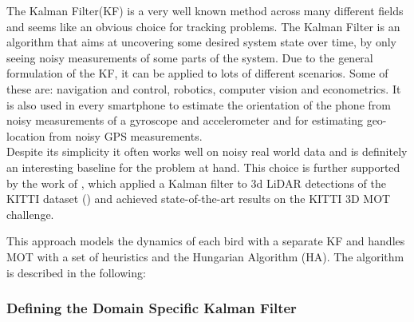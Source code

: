 \documentclass{article}
\begin{document}
The Kalman Filter(KF) is a very well known method across many different fields and seems like an obvious choice for tracking problems. The Kalman Filter is an algorithm that aims at uncovering some desired system state over time, by only seeing noisy measurements of some parts of the system. Due to the general formulation of the KF, it can be applied to lots of different scenarios. Some of these are: navigation and control, robotics, computer vision and econometrics. It is also used in every smartphone to estimate the orientation of the phone from noisy measurements of a gyroscope and accelerometer and for estimating geo-location from noisy GPS measurements. \\%
Despite its simplicity it often works well on noisy real world data and is definitely an interesting baseline for the problem at hand. This choice is further supported by the work of \cite{3d_kalman}, which applied a Kalman filter to 3d LiDAR detections of the KITTI dataset (\cite{kitti}) and achieved state-of-the-art results on the KITTI 3D MOT challenge. %







This approach models the dynamics of each bird with a separate KF and handles MOT with a set of heuristics and the Hungarian Algorithm (HA). %
The algorithm is described in the following: \\





\subsubsection{Defining the Domain Specific Kalman Filter}




\end{document}
